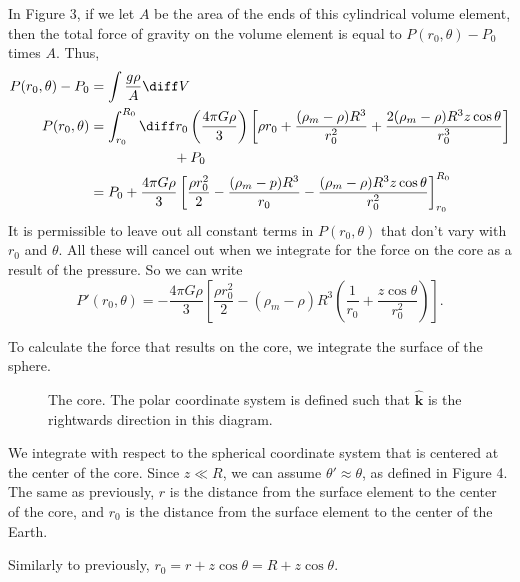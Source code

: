 \documentclass[12pt]{article}
\begin{document}
In Figure 3, if we let $A$ be the area of the ends of this cylindrical volume element, then the total force of gravity on the volume element is equal to $P(r_0,\theta) - P_0$ times $A.$  Thus,
\begin{align*}
	P(r_0,\theta) - P_0 &= \int \frac{g\rho}{A} \diff V \\
	P(r_0,\theta) &= \int_{r_0}^{R_0} \diff r_0 \left( \frac{4\pi G \rho}{3} \right)\left[ \rho r_0 + \frac{(\rho_m - \rho)R^3}{r_0^2} + \frac{2(\rho_m - \rho)R^3 z \cos\theta}{r_0^3} \right]\\
		      & \qquad \qquad \qquad + P_0 \\
		      &= P_0 + \frac{4\pi G \rho}{3}\left[ \frac{\rho r_0^2}{2} - \frac{(\rho_m - p)R^3}{r_0} - \frac{(\rho_m - \rho)R^3 z \cos\theta}{r_0^2} \right]_{r_0}^{R_0}
\end{align*}
It is permissible to leave out all constant terms in $P(r_0,\theta)$ that don't vary with $r_0$ and $\theta$.  All these will cancel out when we integrate for the force on the core as a result of the pressure.  So we can write
\[
	P'(r_0,\theta) = -\frac{4\pi G\rho}{3}\left[ \frac{\rho r_0^2}{2} - (\rho_m - \rho)R^3\left( \frac{1}{r_0} + \frac{z\cos\theta}{r_0^2} \right) \right].
\]

To calculate the force that results on the core, we integrate the surface of the sphere.  

\begin{figure}[ht]
	\centering
	\caption{The core.  The polar coordinate system is defined such that $\hat{\mathbf{k}}$ is the rightwards direction in this diagram.}
\end{figure}

We integrate with respect to the spherical coordinate system that is centered at the center of the core.  Since $z \ll R$, we can assume $\theta' \approx \theta$, as defined in Figure 4.  The same as previously, $r$ is the distance from the surface element to the center of the core, and $r_0$ is the distance from the surface element to the center of the Earth.

Similarly to previously, $r_0 = r + z\cos\theta = R + z\cos\theta.$
\end{document}
